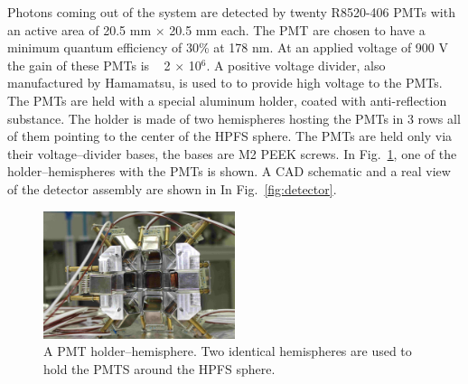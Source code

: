 Photons coming out of the system are detected by twenty R8520-406 PMTs with an 
active area of 20.5 mm $\times$ 20.5 mm each. 
The PMT are chosen to have a minimum 
quantum efficiency of 30\% at 178 nm. At an applied voltage of 900 
V the gain of these PMTs is ~ 2 $\times$ 10$^6$. A positive voltage divider, 
also manufactured by Hamamatsu,  is used to to provide high voltage to the PMTs. 
The PMTs are held with a special aluminum holder, coated with anti-reflection substance. 
The holder is made of two hemispheres hosting the PMTs in 3 rows all of them pointing to the 
center of the HPFS sphere. The PMTs are held only via their voltage--divider bases,  
the bases are  M2 PEEK screws. 
In Fig.~\ref{fig:pmtholder}, one of the holder--hemispheres with the 
PMTs is shown. A CAD schematic and a real view of the detector assembly are shown 
in In Fig.~\ref{fig:detector}.

\begin{figure}[h]
   \centering
   \includegraphics[width=0.5\textwidth]{PMTholder.JPG}
   \caption{A PMT holder--hemisphere. Two identical hemispheres are used to hold 
   the PMTS around the HPFS sphere.} 
   \label{fig:pmtholder}
\end{figure}

